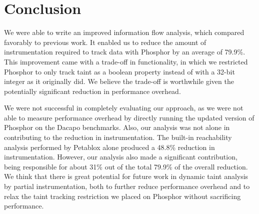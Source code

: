 \chapter{Conclusion}
We were able to write an improved information flow analysis, which
compared favorably to previous work. It enabled us to reduce the
amount of instrumentation required to track data with Phosphor by an
average of 79.9\%. This improvement came with a trade-off in
functionality, in which we restricted Phosphor to only track taint as
a boolean property instead of with a 32-bit integer as it originally
did.  We believe the trade-off is worthwhile given the potentially
significant reduction in performance overhead. 

We were not successful in completely evaluating our approach, as we
were not able to measure performance overhead by directly running the
updated version of Phosphor on the Dacapo benchmarks. Also, our
analysis was not alone in contributing to the reduction in
instrumentation. The built-in reachability analysis performed by
Petablox alone produced a 48.8\% reduction in instrumentation.
However, our analysis also made a significant contribution, being
responsible for about 31\% out of the total 79.9\% of the overall
reduction. We think that there is great potential for future work in
dynamic taint analysis by partial instrumentation, both to further
reduce performance overhead and to relax the taint tracking
restriction we placed on Phosphor without sacrificing performance.
